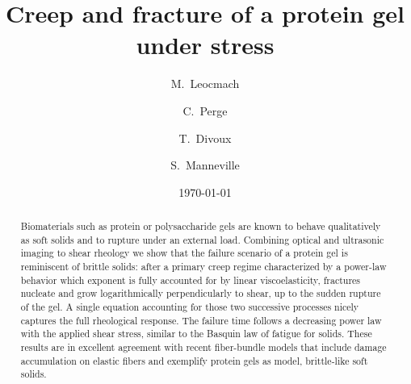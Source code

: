 \documentclass[twocolumn,superscriptaddress,showpacs,preprintnumbers,amsmath,amssymb,prl]{revtex4}
\begin{document}

 \title{Creep and fracture of a protein gel under stress}

\author{M.~Leocmach}
\author{C.~Perge}
\author{T.~Divoux}
\author{S.~Manneville}

\date{\today}

\begin{abstract}
Biomaterials such as protein or polysaccharide gels are known to behave qualitatively as soft solids and to rupture under an external load. Combining optical and ultrasonic imaging to shear rheology we show that the failure scenario of a protein gel is reminiscent of brittle solids: after a primary creep regime characterized by a power-law behavior which exponent is fully accounted for by linear viscoelasticity, fractures nucleate and grow logarithmically perpendicularly to shear, up to the sudden rupture of the gel. A single equation accounting for those two successive processes nicely captures the full rheological response. The failure time follows a decreasing power law with the applied shear stress, similar to the Basquin law of fatigue for solids. These results are in excellent agreement with recent fiber-bundle models that include damage accumulation on elastic fibers and exemplify protein gels as model, brittle-like soft solids.
\end{abstract}

\maketitle
\end{document}
